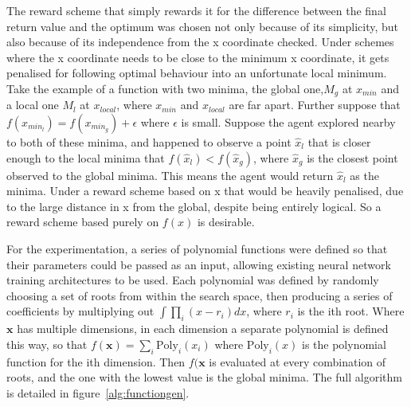 The reward scheme that simply rewards it for the difference between the final return value and the optimum was chosen not only because of its simplicity, but also because of its independence from the x coordinate checked. Under schemes where the x coordinate needs to be close to the minimum x coordinate, it gets penalised for following optimal behaviour into an unfortunate local minimum. Take the example of a function with two minima, the global one,$M_g$ at $x_{min}$ and a local one $M_l$ at $x_{local}$, where $x_{min}$ and $x_{local}$ are far apart. Further suppose that $f(x_{min_l}) = f(x_{min_g}) + \epsilon$ where $\epsilon$ is small. Suppose the agent explored nearby to both of these minima, and happened to observe a point $\hat x_l$ that is closer  enough to the local minima that $f(\hat x_l) < f(\hat x_g)$, where $\hat x_g$ is the closest point observed to the global minima. This means the agent would return $\hat x_l$ as the minima. Under a reward scheme based on x that would be heavily penalised, due to the large distance in x from the global, despite being entirely logical. So a reward scheme based  purely on $f(x)$ is desirable.

For the experimentation, a series of polynomial functions were defined so that their parameters could be passed as an input, allowing existing neural network training architectures to be used. Each polynomial was defined by randomly choosing a set of roots from within the search space, then producing a series of coefficients by multiplying out
$\int \prod_i (x - r_i) dx$, where $r_i$ is the ith root. Where $\boldsymbol{x}$ has multiple dimensions, in each dimension a separate polynomial is defined this way, so that $f(\boldsymbol{x})  = \sum_i \text{Poly}_i(x_i)$ where $\text{Poly}_i(x)$ is the polynomial function for the ith dimension. Then $f(\boldsymbol{x}$ is evaluated at every combination of roots, and the one with the lowest value is the global minima. The full algorithm is detailed in figure~\ref{alg:functiongen}.

